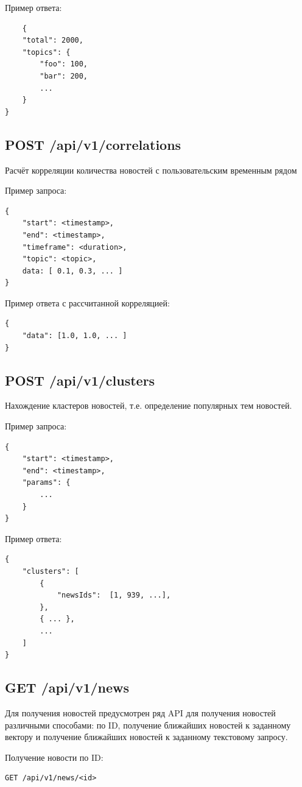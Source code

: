 Пример ответа:
\begin{lstlisting}
    {
    "total": 2000,
    "topics": {
        "foo": 100,
        "bar": 200,
        ...
    }
}
\end{lstlisting}

\subsection{POST /api/v1/correlations}
Расчёт корреляции количества новостей с пользовательским временным рядом

Пример запроса:
\begin{lstlisting}
{
    "start": <timestamp>,
    "end": <timestamp>,
    "timeframe": <duration>,
    "topic": <topic>,
    data: [ 0.1, 0.3, ... ]
}
\end{lstlisting}

Пример ответа с рассчитанной корреляцией:
\begin{lstlisting}
{
    "data": [1.0, 1.0, ... ]
}
\end{lstlisting}

\subsection{POST /api/v1/clusters}
Нахождение кластеров новостей, т.е. определение популярных тем новостей.

Пример запроса:
\begin{lstlisting}
{
    "start": <timestamp>,
    "end": <timestamp>,
    "params": {
        ...
    }
}
\end{lstlisting}

Пример ответа:
\begin{lstlisting}
{
    "clusters": [
        {
            "newsIds":  [1, 939, ...],
        },
        { ... },
        ...
    ]
}
\end{lstlisting}

\subsection{GET /api/v1/news}
Для получения новостей предусмотрен ряд API для получения новостей различными способами: по ID, получение ближайших новостей к заданному вектору и получение ближайших новостей к заданному текстовому запросу.

Получение новости по ID:
\begin{lstlisting}
GET /api/v1/news/<id>
\end{lstlisting}


